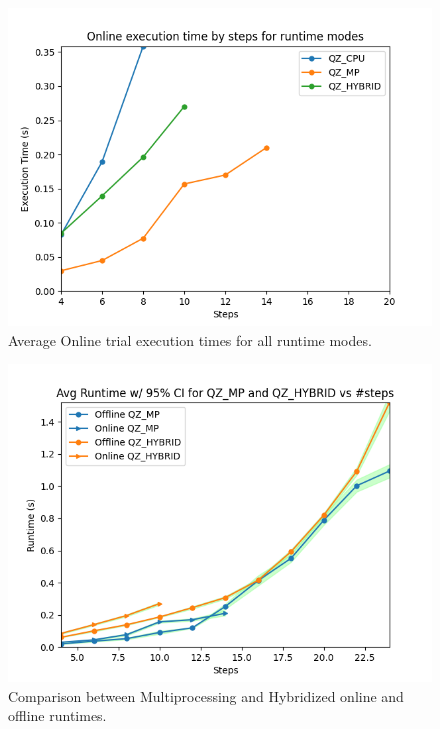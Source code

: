 \documentclass[runningheads]{llncs}
\begin{document}
\begin{figure}[t]
\includegraphics[width=\textwidth]{profiler_out/online_avg_unified.png}
\caption{Average Online trial execution times for all runtime modes.} \label{online_avg}
\end{figure}
\begin{figure}[t]
\includegraphics[width=\textwidth]{profiler_out/avg_mp_hybrid_CI.png}
\caption{Comparison between Multiprocessing and Hybridized online and offline runtimes.} \label{mp_hybrid_ci}
\end{figure}
\end{document}
